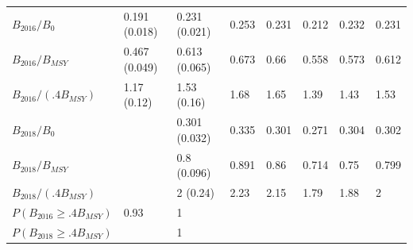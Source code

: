 \documentclass[11pt]{book}
\begin{document}
\begin{landscape}
\begin{longtable}[t]{llllllll}
$B_{2016}/B_0$ & 0.191 (0.018) & 0.231 (0.021) & 0.253 & 0.231 & 0.212 & 0.232 & 0.231\\
$B_{2016}/B_{MSY}$ & 0.467 (0.049) & 0.613 (0.065) & 0.673 & 0.66 & 0.558 & 0.573 & 0.612\\
$B_{2016}/(.4B_{MSY})$ & 1.17 (0.12) & 1.53 (0.16) & 1.68 & 1.65 & 1.39 & 1.43 & 1.53\\
$B_{2018}/B_0$ &  & 0.301 (0.032) & 0.335 & 0.301 & 0.271 & 0.304 & 0.302\\
$B_{2018}/B_{MSY}$ &  & 0.8 (0.096) & 0.891 & 0.86 & 0.714 & 0.75 & 0.799\\
$B_{2018}/(.4B_{MSY})$ &  & 2 (0.24) & 2.23 & 2.15 & 1.79 & 1.88 & 2\\
$P(B_{2016} \geq .4B_{MSY})$ & 0.93 & 1 &  &  &  &  & \\
$P(B_{2018} \geq .4B_{MSY})$ &  & 1 &  &  &  &  & \\*
\end{longtable}
\end{landscape}
\endgroup{}

\newpage
\end{document}
